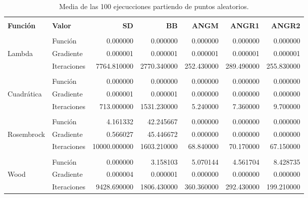 \begin{table}[H]
    \changefontsizes{10pt}
    \centering
    \begin{tabular}{llrrrrr}
        \hline                                                                                                           \\
        \textbf{Función} & \textbf{Valor} & \textbf{SD}  & \textbf{BB} & \textbf{ANGM} & \textbf{ANGR1} & \textbf{ANGR2} \\[0.1cm]\hline
        \\
                         & Función        & 0.000000     & 0.000000    & 0.000000      & 0.000000       & 0.000000       \\[0.25cm]
        Lambda           & Gradiente      & 0.000001     & 0.000001    & 0.000001      & 0.000001       & 0.000001       \\[0.25cm]
                         & Iteraciones    & 7764.810000  & 2770.340000 & 252.430000    & 289.490000     & 255.830000     \\[0.25cm]\hline
        \\
                         & Función        & 0.000000     & 0.000000    & 0.000000      & 0.000000       & 0.000000       \\[0.25cm]
        Cuadrática       & Gradiente      & 0.000001     & 0.000001    & 0.000000      & 0.000000       & 0.000000       \\[0.25cm]
                         & Iteraciones    & 713.000000   & 1531.230000 & 5.240000      & 7.360000       & 9.700000       \\[0.25cm]\hline
        \\
                         & Función        & 4.161332     & 42.245667   & 0.000000      & 0.000000       & 0.000000       \\[0.25cm]
        Rosembrock       & Gradiente      & 0.566027     & 45.446672   & 0.000000      & 0.000000       & 0.000000       \\[0.25cm]
                         & Iteraciones    & 10000.000000 & 1603.210000 & 68.840000     & 70.170000      & 67.150000      \\[0.25cm]\hline
        \\
                         & Función        & 0.000000     & 3.158103    & 5.070144      & 4.561704       & 8.428735       \\[0.25cm]
        Wood             & Gradiente      & 0.000004     & 0.000001    & 0.000000      & 0.000000       & 0.000000       \\[0.25cm]
                         & Iteraciones    & 9428.690000  & 1806.430000 & 360.360000    & 292.430000     & 199.210000     \\[0.25cm]\hline
    \end{tabular}
    \caption{Media de las 100 ejecucciones partiendo de puntos aleatorios.}
    \label{table:mean}
\end{table}